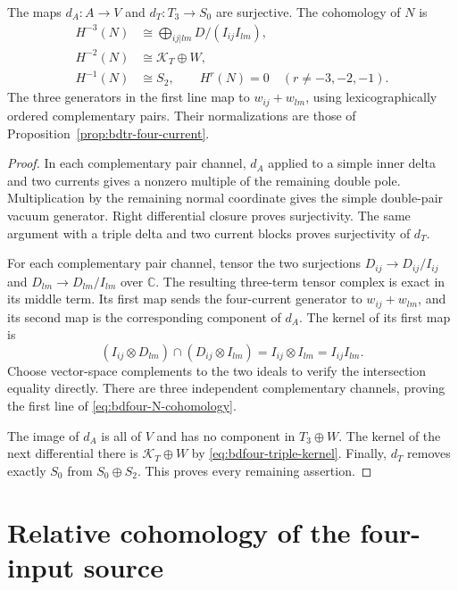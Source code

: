 \begin{theorem}\label{thm:bdfour-N-cohomology}
The maps $d_A:A\to V$ and $d_T:T_3\to S_0$ are surjective.
The cohomology of $N$ is
\begin{equation}\label{eq:bdfour-N-cohomology}
 \begin{aligned}
 H^{-3}(N)&\cong\bigoplus_{ij|lm}D/(I_{ij}I_{lm}),\\
 H^{-2}(N)&\cong\mathcal K_T\oplus W,\\
 H^{-1}(N)&\cong S_2,
 \qquad H^r(N)=0\quad(r\ne-3,-2,-1).
 \end{aligned}
\end{equation}
The three generators in the first line map to $w_{ij}+w_{lm}$, using lexicographically ordered complementary pairs.
Their normalizations are those of Proposition~\ref{prop:bdtr-four-current}.
\end{theorem}
\begin{proof}
In each complementary pair channel, $d_A$ applied to a simple inner delta and two currents gives a nonzero multiple of the remaining double pole.
Multiplication by the remaining normal coordinate gives the simple double-pair vacuum generator.
Right differential closure proves surjectivity.
The same argument with a triple delta and two current blocks proves surjectivity of $d_T$.

For each complementary pair channel, tensor the two surjections
$D_{ij}\to D_{ij}/I_{ij}$ and $D_{lm}\to D_{lm}/I_{lm}$ over $\mathbb C$.
The resulting three-term tensor complex is exact in its middle term.
Its first map sends the four-current generator to $w_{ij}+w_{lm}$, and its second map is the corresponding component of $d_A$.
The kernel of its first map is
\[
 (I_{ij}\otimes D_{lm})\cap(D_{ij}\otimes I_{lm})
 =I_{ij}\otimes I_{lm}=I_{ij}I_{lm}.
\]
Choose vector-space complements to the two ideals to verify the intersection equality directly.
There are three independent complementary channels, proving the first line of \eqref{eq:bdfour-N-cohomology}.

The image of $d_A$ is all of $V$ and has no component in $T_3\oplus W$.
The kernel of the next differential there is $\mathcal K_T\oplus W$ by \eqref{eq:bdfour-triple-kernel}.
Finally, $d_T$ removes exactly $S_0$ from $S_0\oplus S_2$.
This proves every remaining assertion.
\end{proof}

\section{Relative cohomology of the four-input source}

